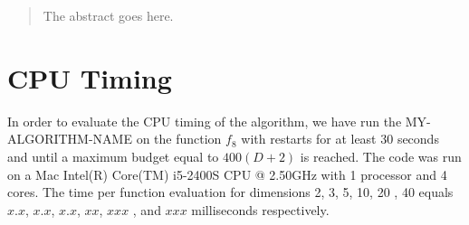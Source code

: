 \documentclass[conference]{IEEEtran}
\newcommand{\change}[1]{{\color{red} #1}}
\begin{document}




\maketitle


\begin{abstract}
The abstract goes here.
\end{abstract}





%
\IEEEpeerreviewmaketitle


%
%
%
\section{CPU Timing}
In order to evaluate the CPU timing of the algorithm, we have run the \change{MY-ALGORITHM-NAME} on the function $f_{8}$ with restarts for at least 30 seconds and until a maximum budget equal to \change{$400 (D + 2)$} is reached. The code was run on a \change{Mac Intel(R) Core(TM) i5-2400S CPU @ 2.50GHz} with \change{1} processor and \change{4} cores. The time per function evaluation for dimensions 2, 3, 5, 10, 20\change{, 40} equals \change{$x.x$}, \change{$x.x$}, \change{$x.x$}, \change{$xx$}, \change{$xxx$}\change{, and $xxx$} milliseconds respectively. 
\end{document}
